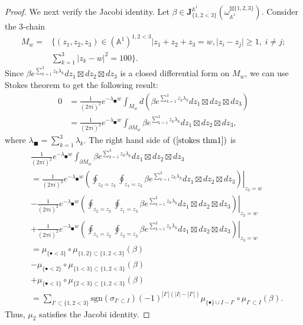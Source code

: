 \documentclass[11pt]{amsart}
\theoremstyle{definition}
\theoremstyle{remark}
\numberwithin{equation}{section}
\begin{document}
\begin{proof}
We next verify the Jacobi identity.
Let $\beta\in \mathbf{J}^{\mathbb{A}^1}_{\{1,2<3\}}(\omega_{\mathbb{A}^1}^{\boxtimes\{1,2,3\}})$. Consider the $3$-chain
\begin{align*} 
M_{w}=&\{(z_{1},z_{2},z_{3})\in (\mathbb{A}^1)^{1,2<3}|z_{1}+z_{2}+z_{3}=w,|z_{i}-z_{j}|\geq 1,\;i\neq j;\\
&\sum_{k=1}^{3}|z_{k}-w|^{2}=100\}.
\end{align*}
Since $\beta e^{\sum_{k=1}^{3}z_{k}\lambda_{k}}dz_{1}\boxtimes dz_{2}\boxtimes dz_{3}$ is a closed differential form on $M_{w}$, we can use Stokes theorem to get the following result:
\begin{equation}
\begin{aligned}
\label{stokes thm1}
    0 &= 
    \frac{1}{(2\pi i)^{2}}e^{-\lambda_{\blacksquare }w}\int_{M_{w}}d\left(\beta e^{\sum_{k=1}^{3}z_{k}\lambda_{k}}dz_{1}\boxtimes dz_{2}\boxtimes dz_{3}\right)\\
    &=
     \frac{1}{(2\pi i)^{2}}e^{-\lambda_{\blacksquare }w}\int_{\partial M_{w}}\beta e^{\sum_{k=1}^{3}z_{k}\lambda_{k}}dz_{1}\boxtimes dz_{2}\boxtimes dz_{3},
\end{aligned}
\end{equation}
where $\lambda_{\blacksquare}=\sum_{k=1}^3\lambda_{k}$.
The right hand side of $(\ref{stokes thm1})$ is
\begin{align*}
     &
     \frac{1}{(2\pi i)^{2}}e^{-\lambda_{\blacksquare }w}\int_{\partial M_{w}}\beta e^{\sum_{k=1}^{3}z_{k}\lambda_{k}}dz_{1}\boxtimes dz_{2}\boxtimes dz_{3}\\
     &=
     \frac{1}{(2\pi i)^{2}}e^{-\lambda_{\blacksquare }w}\left.\left(\oint_{z_{2}=z_{3}}\oint_{z_{1}=z_{2}}\beta e^{\sum_{k=1}^{3}z_{k}\lambda_{k}}dz_{1}\boxtimes dz_{2}\boxtimes dz_{3}\right)\right|_{z_{3}=w}\\
     &-
     \frac{1}{(2\pi i)^{2}}e^{-\lambda_{\blacksquare }w}\left.\left(\oint_{z_{2}=z_{3}}\oint_{z_{1}=z_{3}}\beta e^{\sum_{k=1}^{3}z_{k}\lambda_{k}}dz_{1}\boxtimes dz_{2}\boxtimes dz_{3}\right)\right|_{z_{3}=w}\\
     &+
     \frac{1}{(2\pi i)^{2}}e^{-\lambda_{\blacksquare }w}\left.\left(\oint_{z_{1}=z_{2}}\oint_{z_{2}=z_{3}}\beta e^{\sum_{k=1}^{3}z_{k}\lambda_{k}}dz_{1}\boxtimes dz_{2}\boxtimes dz_{3}\right)\right|_{z_{3}=w}\\
     &=
     \mu_{\{\bullet<3\}}\circ \mu_{\{1,2\}\subset\{1,2<3\}}(\beta)\\
     &-
     \mu_{\{\bullet<2\}}\circ \mu_{\{1<3\}\subset\{1,2<3\}}(\beta)\\
     &+
     \mu_{\{\bullet<1\}}\circ \mu_{\{2<3\}\subset\{1,2<3\}}(\beta)\\
     &=  
     \sum_{ I'\subset\{1,2<3\}}\mathrm{sgn}(\sigma_{ I'\subset I})(-1)^{|I'|(|I|-|I'|)}\mu_{\{\bullet\}
     \cup I- I'}\circ \mu_{ I'\subset I}(\beta).
\end{align*}
Thus, $\mu_2$ satisfies the Jacobi identity.
\end{proof}
\end{document}
